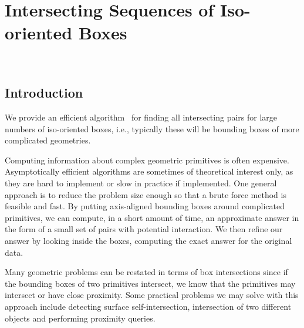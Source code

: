 
\newcommand{\LK}[1]{\textbf{L.K.:#1???}}

\ccParDims

\chapter{Intersecting Sequences of Iso-oriented Boxes}
\label{chapterBoxIntersection}
\\


\section{Introduction}

We provide an efficient algorithm~\cite{cgal:ze-fsbi-02} for finding all
intersecting pairs for large numbers of iso-oriented boxes, i.e.,
typically these will be bounding boxes of more complicated geometries.

Computing information about complex geometric primitives is often
expensive. Asymptotically efficient algorithms are sometimes of
theoretical interest only, as they are hard to implement or slow in
practice if implemented. One general approach is to reduce the problem
size enough so that a brute force method is feasible and fast. By
putting axis-aligned bounding boxes around complicated primitives, we
can compute, in a short amount of time, an approximate answer in the
form of a small set of pairs with potential interaction.  We then
refine our answer by looking inside the boxes, computing the exact
answer for the original data.

Many geometric problems can be restated in terms of box intersections
since if the bounding boxes of two primitives intersect, we know that
the primitives may intersect or have close proximity. Some practical
problems we may solve with this approach include detecting surface
self-intersection, intersection of two different objects and
performing proximity queries.


